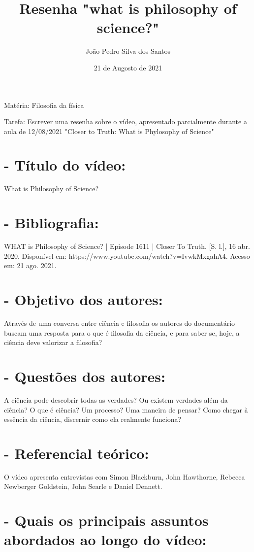 \documentclass{article}
\title{Resenha "what is philosophy of science?"}
\author{João Pedro Silva dos Santos}
\date{21 de Augosto de 2021}
\begin{document}
\maketitle

Matéria: Filosofia da física


Tarefa: Escrever uma resenha sobre o vídeo, apresentado parcialmente durante a aula de 12/08/2021 "Closer to Truth: What is Phylosophy of Science" 


\section*{- Título do vídeo:}

What is Philosophy of Science?

\section*{- Bibliografia:}

WHAT is Philosophy of Science? | Episode 1611 | Closer To Truth. [S. l.], 16 abr. 2020. Disponível em: https://www.youtube.com/watch?v=IvwkMxgahA4. Acesso em: 21 ago. 2021.

\section*{- Objetivo dos autores:}

Através de uma conversa entre ciência e filosofia os autores do documentário buscam uma resposta para o que é filosofia da ciência, e para saber se, hoje, a ciência deve valorizar a filosofia?

\section*{- Questões dos autores:}

A ciência pode descobrir todas as verdades? Ou existem verdades além da ciência? O que é ciência? Um processo? Uma maneira de pensar? Como chegar à essência da ciência, discernir como ela realmente funciona? 

\section*{- Referencial teórico:}

O vídeo apresenta entrevistas com Simon Blackburn, John Hawthorne, Rebecca Newberger Goldstein, John Searle e Daniel Dennett. 

\section*{- Quais os principais assuntos abordados ao longo do vídeo:}
\end{document}
